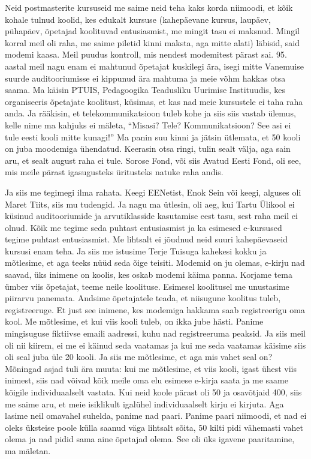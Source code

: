 Neid postmasterite kursuseid me saime neid teha kaks korda niimoodi, et kõik kohale tulnud koolid, kes edukalt kursuse (kahepäevane kursus, laupäev, pühapäev, õpetajad koolituvad entusiasmist, me mingit tasu ei maksnud. Mingil korral meil oli raha, me saime piletid kinni maksta, aga mitte alati) läbisid, said modemi kaasa. Meil puudus kontroll, mis nendest modemitest pärast sai. 95. aastal meil nagu enam ei mahtunud õpetajat kuskilegi ära, isegi mitte Vanemuise suurde auditooriumisse ei kippunud ära mahtuma ja meie võhm hakkas otsa saama. Ma käisin PTUIS, Pedagoogika Teadusliku Uurimise Instituudis, kes organiseeris õpetajate koolitust, küsimas, et kas nad meie kursustele ei taha raha anda. Ja rääkisin, et telekommunikatsioon tuleb kohe ja siis siis vastab ülemus, kelle nime ma kahjuks ei mäleta, \enquote{Misasi? Tele? Kommunikatsioon? See asi ei tule eesti kooli mitte kunagi!} Ma panin suu kinni ja jätsin ütlemata, et  50 kooli on juba moodemiga ühendatud. Keerasin otsa ringi, tulin sealt välja, aga sain aru, et sealt august raha ei tule. Sorose Fond, või siis Avatud Eesti Fond, oli see, mis meile pärast igasugusteks üritusteks natuke raha andis. 

Ja siis me tegimegi ilma rahata. Keegi EENetist, Enok Sein või keegi, alguses oli Maret Tiits, siis mu tudengid. Ja nagu ma ütlesin, oli aeg, kui Tartu Ülikool ei küsinud auditooriumide ja arvutiklasside kasutamise eest tasu, sest raha meil ei olnud. Kõik me tegime seda puhtast entusiasmist ja ka esimesed e-kursused tegime puhtast entusiasmist. Me lihtsalt ei jõudnud neid suuri kahepäevaseid kursusi enam teha. Ja siis me istusime Terje Tuisuga kahekesi kokku ja mõtlesime, et aga teeks nüüd seda õige teisiti. Modemid on ju olemas, e-kirju nad saavad, üks inimene on koolis, kes oskab modemi käima panna. Korjame tema ümber viis õpetajat, teeme neile koolituse. Esimesel koolitusel me unustasime piirarvu panemata. Andsime õpetajatele teada, et niisugune koolitus tuleb, registreeruge. Et just see inimene, kes modemiga hakkama saab registreerigu oma kool. Me mõtlesime, et kui viis kooli tuleb, on ikka jube hästi. Panime mingisuguse fiktiivse emaili aadressi, kuhu nad registreeruma peaksid. Ja siis meil oli nii kiirem, ei me ei käinud seda vaatamas ja kui me seda vaatamas käisime siis oli seal juba üle 20 kooli. Ja siis me mõtlesime, et aga mis vahet seal on? Mõningad asjad tuli ära muuta: kui me mõtlesime, et viis kooli, igast ühest viis inimest, siis nad võivad kõik meile oma elu esimese e-kirja saata ja me saame kõigile individuaalselt vastata. Kui neid koole pärast oli 50 ja osavõtjaid 400, siis me saime aru, et meie isiklikult igalühel individuaalselt kirju ei kirjuta. Aga  lasime neil omavahel suhelda, panime nad paari. Panime paari niimoodi, et nad ei oleks üksteise poole külla saanud väga lihtsalt sõita, 50 kilti pidi vähemasti vahet olema ja nad pidid sama aine õpetajad olema. See oli üks igavene paaritamine, ma mäletan.  

